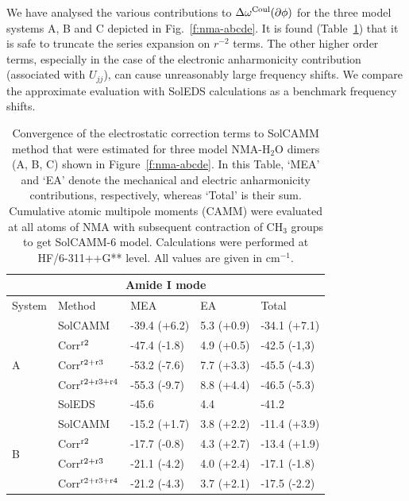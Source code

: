 \documentclass[b5paper,oneside,fleqn,11pt]{book}
\begin{document}
\begin{appendices}
We have analysed the various contributions to $\Delta\omega^{\rm Coul}(\partial\phi)$
for the three model systems A, B and C depicted in Fig.~\ref{f:nma-abcde}. It is found 
(Table~\ref{t:ctest}) that
it is safe to truncate the series expansion on $r^{-2}$ terms. The other higher order terms,
especially in the case of the electronic anharmonicity contribution 
(associated with $U_{jj}$), can cause unreasonably
large frequency shifts. 
We compare the approximate evaluation with SolEDS calculations as a benchmark frequency shifts.

\begin{table}[ht]
\caption{Convergence of the electrostatic correction terms to SolCAMM
method that were estimated for three model NMA-H$_2$O dimers (A, B, C)
shown in Figure~\ref{f:nma-abcde}. In this Table, `MEA' and `EA' denote the mechanical and electric
anharmonicity contributions, respectively, whereas `Total' is their sum.
Cumulative atomic multipole moments (CAMM) were evaluated 
at all atoms of NMA with subsequent contraction of CH$_3$ groups 
to get SolCAMM-6 model.
Calculations were performed at HF/6-311++G** level.
All values are given in cm$^{-1}$.
\label{t:ctest}}
\begin{tabular*}{1.0\textwidth}{@{\extracolsep{\fill} } l ll ll}
\hline\hline
\multicolumn{5}{c}{Amide I mode} \\
\hline
System               & Method    & MEA           & EA         & Total        \\
\hline
\multirow{5}{*}{A}   & SolCAMM   & -39.4 (+6.2)  & 5.3 (+0.9) & -34.1 (+7.1) \\
        & Corr$^{\rm r2}$        & -47.4 (-1.8)  & 4.9 (+0.5) & -42.5 (-1,3) \\
        & Corr$^{\rm r2+r3}$     & -53.2 (-7.6)  & 7.7 (+3.3) & -45.5 (-4.3) \\
        & Corr$^{\rm r2+r3+r4}$  & -55.3 (-9.7)  & 8.8 (+4.4) & -46.5 (-5.3) \\
                     & SolEDS    & -45.6         & 4.4        & -41.2        \\
\hline
\multirow{5}{*}{B}   & SolCAMM   & -15.2 (+1.7)  & 3.8 (+2.2) & -11.4 (+3.9) \\
        & Corr$^{\rm r2}$        & -17.7 (-0.8)  & 4.3 (+2.7) & -13.4 (+1.9) \\
        & Corr$^{\rm r2+r3}$     & -21.1 (-4.2)  & 4.0 (+2.4) & -17.1 (-1.8) \\
        & Corr$^{\rm r2+r3+r4}$  & -21.2 (-4.3)  & 3.7 (+2.1) & -17.5 (-2.2) \\

\end{tabular*}
\end{table}
\end{appendices}
\end{document}
